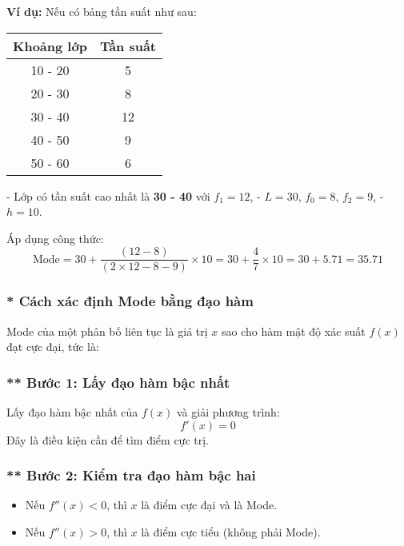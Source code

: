 \textbf{Ví dụ:} Nếu có bảng tần suất như sau:

\begin{center}
\begin{tabular}{|c|c|}
\hline
Khoảng lớp & Tần suất \\
\hline
10 - 20 & 5 \\
20 - 30 & 8 \\
30 - 40 & 12 \\
40 - 50 & 9 \\
50 - 60 & 6 \\
\hline
\end{tabular}
\end{center}

- Lớp có tần suất cao nhất là \textbf{30 - 40} với $f_1 = 12$,
- $L = 30$, $f_0 = 8$, $f_2 = 9$,
- $h = 10$.

Áp dụng công thức:
\begin{equation}
\text{Mode} = 30 + \frac{(12 - 8)}{(2 \times 12 - 8 - 9)} \times 10 = 30 + \frac{4}{7} \times 10 = 30 + 5.71 = 35.71
\end{equation}


\subsubsection*{* Cách xác định Mode bằng đạo hàm}

Mode của một phân bố liên tục là giá trị $x$ sao cho hàm mật độ xác suất $f(x)$ đạt cực đại, tức là:

\subsubsection*{** Bước 1: Lấy đạo hàm bậc nhất}

Lấy đạo hàm bậc nhất của $f(x)$ và giải phương trình:
\begin{equation}
    f'(x) = 0
\end{equation}
Đây là điều kiện cần để tìm điểm cực trị.

\subsubsection*{** Bước 2: Kiểm tra đạo hàm bậc hai}

\begin{itemize}
    \item Nếu $f''(x) < 0$, thì $x$ là điểm cực đại và là Mode.
    \item Nếu $f''(x) > 0$, thì $x$ là điểm cực tiểu (không phải Mode).
\end{itemize}

